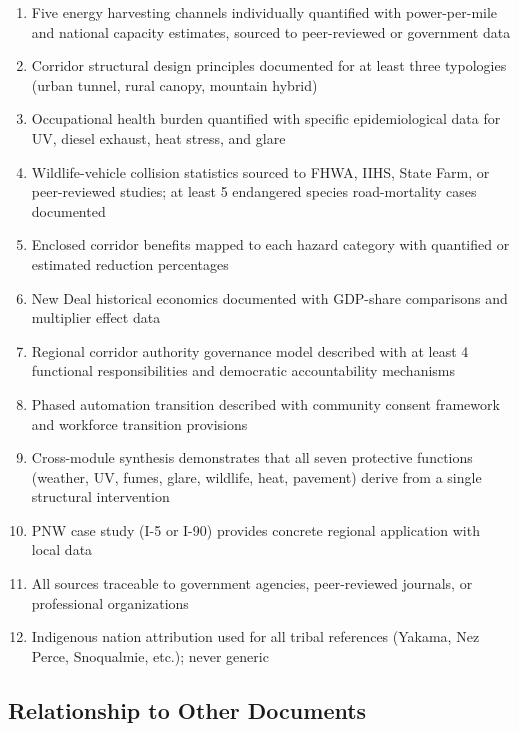 \documentclass[11pt,letterpaper]{article}
\begin{document}
\begin{enumerate}[leftmargin=2em]
  \item Five energy harvesting channels individually quantified with power-per-mile and national capacity estimates, sourced to peer-reviewed or government data
  \item Corridor structural design principles documented for at least three typologies (urban tunnel, rural canopy, mountain hybrid)
  \item Occupational health burden quantified with specific epidemiological data for UV, diesel exhaust, heat stress, and glare
  \item Wildlife-vehicle collision statistics sourced to FHWA, IIHS, State Farm, or peer-reviewed studies; at least 5 endangered species road-mortality cases documented
  \item Enclosed corridor benefits mapped to each hazard category with quantified or estimated reduction percentages
  \item New Deal historical economics documented with GDP-share comparisons and multiplier effect data
  \item Regional corridor authority governance model described with at least 4 functional responsibilities and democratic accountability mechanisms
  \item Phased automation transition described with community consent framework and workforce transition provisions
  \item Cross-module synthesis demonstrates that all seven protective functions (weather, UV, fumes, glare, wildlife, heat, pavement) derive from a single structural intervention
  \item PNW case study (I-5 or I-90) provides concrete regional application with local data
  \item All sources traceable to government agencies, peer-reviewed journals, or professional organizations
  \item Indigenous nation attribution used for all tribal references (Yakama, Nez Perce, Snoqualmie, etc.); never generic
\end{enumerate}

\subsection{Relationship to Other Documents}
\end{document}
